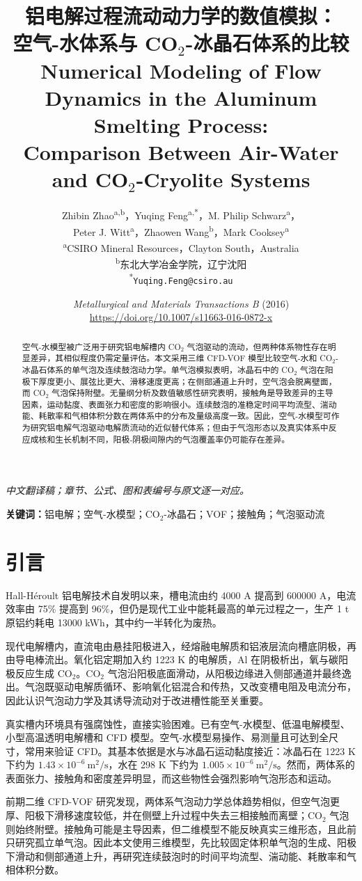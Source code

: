 \documentclass[UTF8,zihao=-4,fontset=fandol]{ctexart}
\title{\bfseries 铝电解过程流动动力学的数值模拟：\\空气-水体系与 CO$_2$-冰晶石体系的比较\\
\large Numerical Modeling of Flow Dynamics in the Aluminum Smelting Process:\\Comparison Between Air-Water and CO$_2$-Cryolite Systems}
\author{Zhibin Zhao\textsuperscript{a,b}，Yuqing Feng\textsuperscript{a,*}，M. Philip Schwarz\textsuperscript{a}，\\Peter J. Witt\textsuperscript{a}，Zhaowen Wang\textsuperscript{b}，Mark Cooksey\textsuperscript{a}\\[.5em]
\small\textsuperscript{a}CSIRO Mineral Resources，Clayton South，Australia\\
\small\textsuperscript{b}东北大学冶金学院，辽宁沈阳\\
\small\textsuperscript{*}\texttt{Yuqing.Feng@csiro.au}}
\date{\small \emph{Metallurgical and Materials Transactions B} (2016)\\
\url{https://doi.org/10.1007/s11663-016-0872-x}}
\begin{document}
\maketitle\thispagestyle{empty}
\begin{center}\small\itshape 中文翻译稿；章节、公式、图和表编号与原文逐一对应。\end{center}
\begin{abstract}
空气-水模型被广泛用于研究铝电解槽内 CO$_2$ 气泡驱动的流动，但两种体系物性存在明显差异，其相似程度仍需定量评估。本文采用三维 CFD-VOF 模型比较空气-水和 CO$_2$-冰晶石体系的单气泡及连续鼓泡动力学。单气泡模拟表明，冰晶石中的 CO$_2$ 气泡在阳极下厚度更小、展弦比更大、滑移速度更高；在侧部通道上升时，空气泡会脱离壁面，而 CO$_2$ 气泡保持附壁。无量纲分析及数值敏感性研究表明，接触角是导致差异的主导因素，运动黏度、表面张力和密度的影响很小。连续鼓泡的准稳定时间平均流型、湍动能、耗散率和气相体积分数在两体系中的分布及量级高度一致。因此，空气-水模型可作为研究铝电解气泡驱动电解质流动的近似替代体系；但由于气泡形态以及真实体系中反应成核和生长机制不同，阳极-阴极间隙内的气泡覆盖率仍可能存在差异。
\end{abstract}
\noindent\textbf{关键词：}铝电解；空气-水模型；CO$_2$-冰晶石；VOF；接触角；气泡驱动流

\section{引言}
Hall-H\'eroult 铝电解技术自发明以来，槽电流由约 4000 A 提高到 600000 A，电流效率由 75\% 提高到 96\%，但仍是现代工业中能耗最高的单元过程之一，生产 1 t 原铝约耗电 13000 kWh，其中约一半转化为废热。

现代电解槽内，直流电由悬挂阳极进入，经熔融电解质和铝液层流向槽底阴极，再由导电棒流出。氧化铝定期加入约 1223 K 的电解质，Al 在阴极析出，氧与碳阳极反应生成 CO$_2$。CO$_2$ 气泡沿阳极底面滑动，从阳极边缘进入侧部通道并最终逸出。气泡既驱动电解质循环、影响氧化铝混合和传热，又改变槽电阻及电流分布，因此认识气泡动力学及其诱导流动对于改进槽性能至关重要。

真实槽内环境具有强腐蚀性，直接实验困难。已有空气-水模型、低温电解模型、小型高温透明电解槽和 CFD 模型。空气-水模型易操作、易测量且可达到全尺寸，常用来验证 CFD。其基本依据是水与冰晶石运动黏度接近：冰晶石在 1223 K 下约为 $1.43\times10^{-6}~\mathrm{m^2/s}$，水在 298 K 下约为 $1.005\times10^{-6}~\mathrm{m^2/s}$。然而，两体系的表面张力、接触角和密度差异明显，而这些物性会强烈影响气泡形态和运动。

前期二维 CFD-VOF 研究发现，两体系气泡动力学总体趋势相似，但空气泡更厚、阳极下滑移速度较低，并在侧壁上升过程中失去三相接触而离壁；CO$_2$ 气泡则始终附壁。接触角可能是主导因素，但二维模型不能反映真实三维形态，且此前只研究孤立单气泡。因此本文使用三维模型，先比较固定体积单气泡的生成、阳极下滑动和侧部通道上升，再研究连续鼓泡时的时间平均流型、湍动能、耗散率和气相体积分数。
\end{document}
